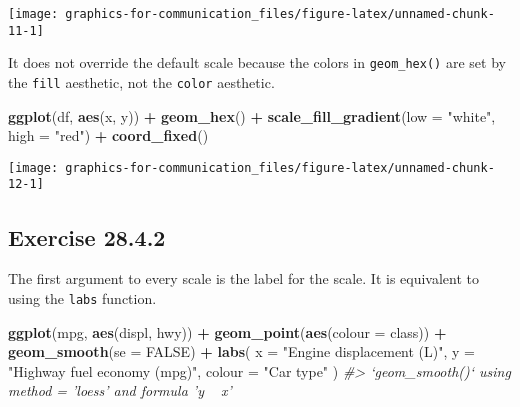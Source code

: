 \documentclass[]{book}
\newenvironment{Shaded}{\begin{snugshade}}{\end{snugshade}}
\newcommand{\CommentTok}[1]{\textcolor[rgb]{0.56,0.35,0.01}{\textit{#1}}}
\newcommand{\DataTypeTok}[1]{\textcolor[rgb]{0.13,0.29,0.53}{#1}}
\newcommand{\KeywordTok}[1]{\textcolor[rgb]{0.13,0.29,0.53}{\textbf{#1}}}
\newcommand{\NormalTok}[1]{#1}
\newcommand{\OperatorTok}[1]{\textcolor[rgb]{0.81,0.36,0.00}{\textbf{#1}}}
\newcommand{\OtherTok}[1]{\textcolor[rgb]{0.56,0.35,0.01}{#1}}
\newcommand{\StringTok}[1]{\textcolor[rgb]{0.31,0.60,0.02}{#1}}
\theoremstyle{plain}
\theoremstyle{remark}
\theoremstyle{definition}
\theoremstyle{definition}
\theoremstyle{definition}
\theoremstyle{remark}
\begin{document}
\begin{center}\texttt{[image: graphics-for-communication\_files/figure-latex/unnamed-chunk-11-1]} \end{center}

It does not override the default scale because the colors in
\texttt{geom\_hex()} are set by the \texttt{fill} aesthetic, not the
\texttt{color} aesthetic.

\begin{Shaded}
\begin{Highlighting}[]
\KeywordTok{ggplot}\NormalTok{(df, }\KeywordTok{aes}\NormalTok{(x, y)) }\OperatorTok{+}
\StringTok{  }\KeywordTok{geom_hex}\NormalTok{() }\OperatorTok{+}
\StringTok{  }\KeywordTok{scale_fill_gradient}\NormalTok{(}\DataTypeTok{low =} \StringTok{"white"}\NormalTok{, }\DataTypeTok{high =} \StringTok{"red"}\NormalTok{) }\OperatorTok{+}
\StringTok{  }\KeywordTok{coord_fixed}\NormalTok{()}
\end{Highlighting}
\end{Shaded}

\begin{center}\texttt{[image: graphics-for-communication\_files/figure-latex/unnamed-chunk-12-1]} \end{center}

\hypertarget{exercise-28.4.2}{%
\subsection*{\texorpdfstring{Exercise
{28.4.2}}{Exercise 28.4.2}}\label{exercise-28.4.2}}

The first argument to every scale is the label for the scale. It is
equivalent to using the \texttt{labs} function.

\begin{Shaded}
\begin{Highlighting}[]
\KeywordTok{ggplot}\NormalTok{(mpg, }\KeywordTok{aes}\NormalTok{(displ, hwy)) }\OperatorTok{+}
\StringTok{  }\KeywordTok{geom_point}\NormalTok{(}\KeywordTok{aes}\NormalTok{(}\DataTypeTok{colour =}\NormalTok{ class)) }\OperatorTok{+}
\StringTok{  }\KeywordTok{geom_smooth}\NormalTok{(}\DataTypeTok{se =} \OtherTok{FALSE}\NormalTok{) }\OperatorTok{+}
\StringTok{  }\KeywordTok{labs}\NormalTok{(}
    \DataTypeTok{x =} \StringTok{"Engine displacement (L)"}\NormalTok{,}
    \DataTypeTok{y =} \StringTok{"Highway fuel economy (mpg)"}\NormalTok{,}
    \DataTypeTok{colour =} \StringTok{"Car type"}
\NormalTok{  )}
\CommentTok{#> `geom_smooth()` using method = 'loess' and formula 'y ~ x'}
\end{Highlighting}
\end{Shaded}
\end{document}
